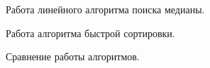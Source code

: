 \documentclass[12pt,a4paper]{article}
\begin{document}

\newpage
\begin{figure}[h!]
\caption{Работа линейного алгоритма поиска медианы.}
\label{ris:0001}
\end{figure}


\begin{figure}[h!]
\caption{Работа алгоритма быстрой сортировки.}
\label{ris:0002}
\end{figure}

\newpage
\begin{figure}[h!]
\caption{Сравнение работы алгоритмов.}
\label{ris:0003}
\end{figure}
\end{document}
